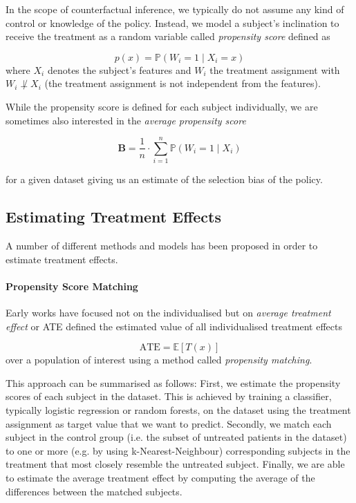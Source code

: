 In the scope of counterfactual inference, we typically do not assume any kind of control or knowledge of the policy. Instead, we model a subject's inclination to receive the treatment as a random variable called \emph{propensity score} defined as 

\begin{equation}
p(x) = \mathbb{P}(W_i = 1 \mid X_i = x)
\end{equation}
where $X_i$ denotes the subject's features and $W_i$ the treatment assignment with $W_i \not \perp X_i$ (the treatment assignment is not independent from the features). 

While the propensity score is defined for each subject individually, we are sometimes also interested in the \emph{average propensity score} 

\begin{equation}
	\mathbf{B} = \frac{1}{n} \cdot \sum \limits_{{i=1}}^{n}  \mathbb{P}(W_i = 1 \mid X_i)
\end{equation}

for a given dataset giving us an estimate of the selection bias of the policy. 

\subsection{Estimating Treatment Effects} \label{sec:status-quo}
A number of different methods and models has been proposed in order to estimate treatment effects. 

\paragraph{Propensity Score Matching} Early works have focused not on the individualised but on \emph{average treatment effect} or ATE defined the estimated value of all individualised treatment effects

\begin{equation}
\text{ATE} = \mathbb{E}[T(x)]
\end{equation}
over a population of interest using a method called \emph{propensity matching}. %

This approach can be summarised as follows: First, we estimate the propensity scores of each subject in the dataset. This is achieved by training a classifier, typically logistic regression or random forests, on the dataset using the treatment assignment as target value that we want to predict. Secondly, we match each subject in the control group (i.e. the subset of untreated patients in the dataset) to one or more (e.g. by using k-Nearest-Neighbour) corresponding subjects in the treatment that most closely resemble the untreated subject. Finally, we are able to estimate  the average treatment effect by computing the average of the differences between the matched subjects. 
 
